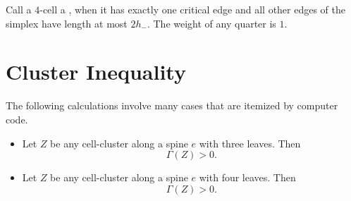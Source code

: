 Call a $4$-cell a , when it has exactly one critical
edge and all other edges of the simplex have length at most $2 h_-$.
The weight of any quarter is $1$.

\section{Cluster Inequality}

%


\begin{calculation}\label{calc:shorts}\cutrate{}
The following calculations involve many cases that are itemized by
computer code.
\begin{itemize}\wasitemize 
\item {} Let $Z$ be any cell-cluster along a spine $e$
with three leaves.  Then
\[ 
\Gamma(Z)> 0.
\] 
\item {} Let $Z$ be any cell-cluster along a spine $e$
with four leaves.  Then
\[ 
\Gamma(Z)> 0.
\] 
\end{itemize}\wasitemize 
\end{calculation}





